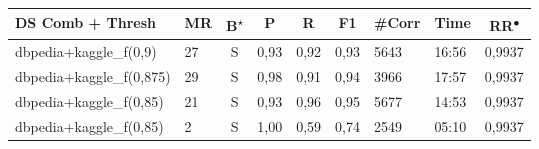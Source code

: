 \documentclass[11pt,titlepage,oneside,openany]{article}
\begin{document}
\begin{table}[]
	\small
	\begin{tabular}{llcllllll}
		\textbf{DS Comb   + Thresh} & \multicolumn{1}{c}{\textbf{MR}} & \textbf{B\textsuperscript{$\star$}} & \multicolumn{1}{c}{\textbf{P}} & \multicolumn{1}{c}{\textbf{R}} & \multicolumn{1}{c}{\textbf{F1}} & \multicolumn{1}{c}{\textbf{\#Corr}} & \multicolumn{1}{c}{\textbf{Time}} & \multicolumn{1}{c}{\textbf{RR\textsuperscript{$\bullet$}}} \\\hline
		dbpedia+kaggle\_f(0,9)      & 27                              & S          & 0,93                           & 0,92                           & 0,93                            & 5643                                & 16:56                             & 0,9937                          \\
		\rowcolor[HTML]{FFFFCC} 
		dbpedia+kaggle\_f(0,875)    & 29                              & S          & 0,98                           & 0,91                           & 0,94                            & 3966                                & 17:57                             & 0,9937                          \\
		dbpedia+kaggle\_f(0,85)     & 21                              & S          & 0,93                           & 0,96                           & 0,95                            & 5677                                & 14:53                             & 0,9937                          \\
		\rowcolor[HTML]{FCCCC8} 
		dbpedia+kaggle\_f(0,85)     & 2                               & S          & 1,00                           & 0,59                           & 0,74                            & 2549                                & 05:10                             & 0,9937                          \\
		

\end{tabular}
\end{table}
\end{document}
